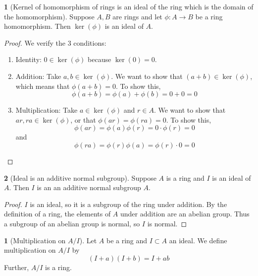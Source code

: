 \documentclass[12pt]{article}
\theoremstyle{definition}
\newtheorem{definition}{\color{NavyBlue}{\textbf{Definition}}}
\newtheorem{theorem}{\color{ForestGreen}{\textbf{Theorem}}}
\theoremstyle{definition}
\begin{document}
\begin{theorem}[Kernel of homomorphism of rings is an ideal of the ring which is the domain of the homomorphism]
	Suppose $A,B$ are rings and let $\phi:A \to B$ be a ring homomorphism. Then $\ker(\phi)$ is an ideal of $A$.
\end{theorem}
\begin{proof}
	We verify the $3$ conditions:
	\begin{enumerate}
		\item Identity: $0 \in \ker(\phi)$ because $\ker(0) = 0$.
		\item Addition: Take $a,b \in \ker(\phi)$. We want to show that $(a+b)\in\ker(\phi)$, which means that $\phi(a+b) = 0$. To show this,
		\begin{equation}
			\phi(a + b) = \phi(a) + \phi(b) = 0 + 0 = 0
		\end{equation}
		\item Multiplication: Take $a \in \ker(\phi)$ and $r \in A$. We want to show that $ar,ra \in \ker(\phi)$, or that $\phi(ar) = \phi(ra) = 0$. To show this,
		\begin{equation}
			\phi(ar) = \phi(a)\phi(r) = 0 \cdot \phi(r) = 0
		\end{equation}
		and 
		\begin{equation}
			\phi(ra) = \phi(r)\phi(a) = \phi(r) \cdot 0 = 0
		\end{equation}
	\end{enumerate}
\end{proof}

\begin{theorem}[Ideal is an additive normal subgroup]
	Suppose $A$ is a ring and $I$ is an ideal of $A$. Then $I$ is an an additive normal subgroup $A$.
\end{theorem}
\begin{proof}
	$I$ is an ideal, so it is a subgroup of the ring under addition. By the definition of a ring, the elements of $A$ under addition are an abelian group. Thus a subgroup of an abelian group is normal, so $I$ is normal. 
\end{proof}

\begin{definition}[Multiplication on $A/I$]
	Let $A$ be a ring and $I \subset A$ an ideal. We define multiplication on $A/I$ by 
	\begin{equation}
		(I+a)(I+b) = I + ab
	\end{equation}
	Further, $A/I$ is a ring.
\end{definition}
\end{document}
